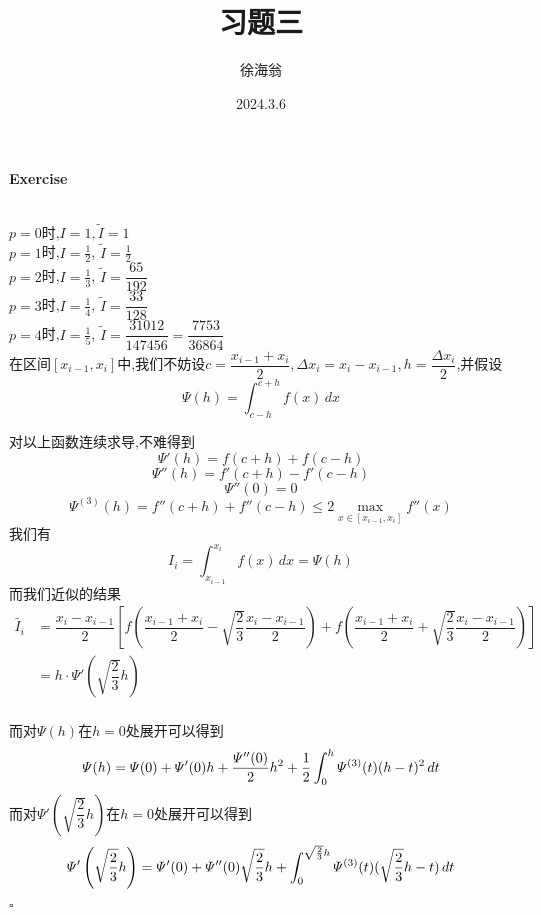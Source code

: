 \documentclass{article}
\title{习题三}
\author{徐海翁}
\date{2024.3.6}
\newenvironment{exercise}[1]{%
{\textbf{Exercise #1} \\ 
    }
}{
  \hfill $\square$ 
  \par\bigskip 
}
\newcommand{\parameter}[1]{\left(#1\right)}
\newcommand{\bracket}[1]{\left[#1\right]}
\begin{document}
\begin{CJK}{UTF8}{gkai}

\maketitle
\tableofcontents

\begin{exercise}{12}    \\

    $p = 0$时,$I = 1,\tilde{I} = 1$\\

    $p = 1$时,$I = \frac{1}{2}$, $\tilde{I} = \frac{1}{2}$\\

    $p = 2$时,$I = \frac{1}{3}$, $\tilde{I} = \dfrac{65}{192}$\\

    $p = 3$时,$I = \frac{1}{4}$, $\tilde{I} = \dfrac{33}{128}$\\

    $p = 4$时,$I = \frac{1}{5}$, $\tilde{I} = \dfrac{31012}{147456} = \dfrac{7753}{36864}$\\

    在区间$[x_{i - 1},x_i]$中,我们不妨设$c = \dfrac{x_{i - 1} + x_i}{2},\Delta x_i = x_{i} - x_{i - 1}, h = \dfrac{\Delta x_i}{2}$,并假设
    \[\varPsi(h) = \int_{c - h}^{c + h}f(x)\, dx\]

    对以上函数连续求导,不难得到
    \[\varPsi'(h) = f(c + h) + f(c - h)\]
    \[\varPsi''(h) = f'(c + h) - f'(c - h)\]
    \[\varPsi''(0) = 0\]
    \[\varPsi^{(3)}(h) = f''(c + h) + f''(c - h) \leq 2 \max_{x \in [x_{i -1},x_i]} f''(x)\]
    我们有
    \[I_i = \int_{x_{i - 1}}^{x_i}f(x)\, dx = \varPsi(h)\]
    而我们近似的结果
    \[
    \begin{aligned}
        \tilde{I_i} &= \dfrac{x_{i} - x_{i - 1}}{2}\bracket{f\parameter{\dfrac{x_{i - 1} + x_{i}}{2} - \sqrt{\dfrac{2}{3}} \dfrac{x_i - x_{i - 1}}{2}} + f\parameter{\dfrac{x_{i - 1} + x_{i}}{2} + \sqrt{\dfrac{2}{3}} \dfrac{x_i - x_{i - 1}}{2}}}\\
        &= h\cdot \varPsi'(\sqrt{\dfrac{2}{3}} h)\\
    \end{aligned}    
    \]

    而对$\varPsi(h)$在$h = 0$处展开可以得到
    \begin{equation}
        \varPsi(h) = \varPsi(0) + \varPsi'(0)h + \dfrac{\varPsi''(0)}{2} h^2 + \dfrac{1}{2}\int_{0}^{h}\varPsi^{(3)}(t)(h - t)^2 \, dt\\
        \label{eq1}
    \end{equation}
    而对$\varPsi'\parameter{\sqrt{\dfrac{2}{3}} h}$在$h = 0$处展开可以得到
    \begin{equation}
        \varPsi'\parameter{\sqrt{\dfrac{2}{3}} h} = \varPsi'(0) + \varPsi''(0) \sqrt{\dfrac{2}{3}} h + \int_{0}^{\sqrt{\frac{2}{3}} h}\varPsi^{(3)}(t)(\sqrt{\frac{2}{3}}h -t)\, dt\\
        \label{eq2}
    \end{equation}


\end{exercise}
\end{CJK}
\end{document}
